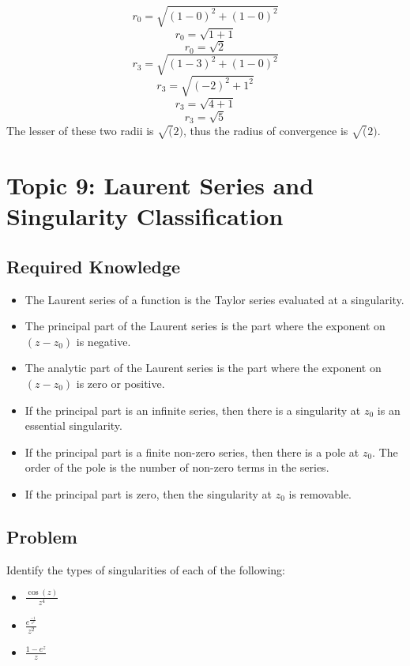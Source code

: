\documentclass[12pt]{article}
\begin{document}
\begin{equation}
	r_0=\sqrt{(1-0)^2+(1-0)^2}
\end{equation}
\begin{equation}
	r_0=\sqrt{1+1}
\end{equation}
\begin{equation}
	r_0=\sqrt{2}
\end{equation}
\begin{equation}
	r_3=\sqrt{(1-3)^2+(1-0)^2}
\end{equation}
\begin{equation}
	r_3=\sqrt{(-2)^2+1^2}
\end{equation}
\begin{equation}
	r_3=\sqrt{4+1}
\end{equation}
\begin{equation}
	r_3=\sqrt{5}
\end{equation}
The lesser of these two radii is $\sqrt(2)$, thus the radius of convergence is $\sqrt(2)$.

\section{Topic 9: Laurent Series and Singularity Classification}
\subsection{Required Knowledge}
\begin{itemize}
    \item The Laurent series of a function is the Taylor series evaluated at a singularity.
    \item The principal part of the Laurent series is the part where the exponent on $(z-z_0)$ is negative.
    \item The analytic part of the Laurent series is the part where the exponent on $(z-z_0)$ is zero or positive.
    \item If the principal part is an infinite series, then there is a singularity at $z_0$ is an essential singularity.
    \item If the principal part is a finite non-zero series, then there is a pole at $z_0$.  The order of the pole is the number of non-zero terms in the series.
    \item If the principal part is zero, then the singularity at $z_0$ is removable.
\end{itemize}
\subsection{Problem}
Identify the types of singularities of each of the following:
\begin{itemize}
	\item $\frac{\cos(z)}{z^4}$
	\item $\frac{e^\frac{-1}{z^2}}{z^2}$
	\item $\frac{1-e^z}{z}$
\end{itemize}
\end{document}

